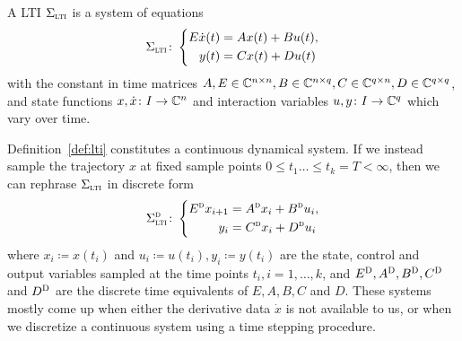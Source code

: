 \begin{definition}\label{def:lti}
    A \acl{LTI} $\Sigma_{\textnormal{\scshape lti}}$ is a system of equations
    \begin{equation}\label{eq:lti}
        \Sigma_{\textnormal{\scshape lti}} \colon \left\lbrace
        \begin{aligned}
            E \dot{x}(t) &= A x(t) + B u(t), \\
            y(t) &= C x(t) + D u(t)
        \end{aligned}
        \right.
    \end{equation}
    with the constant in time matrices $A, E \in \mathbb{C}^{n \times n}, B \in \mathbb{C}^{n \times q}, C \in \mathbb{C}^{q \times n}, D \in \mathbb{C}^{q \times q}$, and state functions $x, \dot{x} \colon I \to \mathbb{C}^n$ and interaction variables $u, y \colon I \to \mathbb{C}^q$ which vary over time.
\end{definition}

\begin{remark}
    Definition~\ref{def:lti} constitutes a continuous dynamical system.
    If we instead sample the trajectory $x$ at fixed sample points $0 \leq t_1 \dots \leq t_k = T < \infty$, then we can rephrase $\Sigma_{\textnormal{\scshape lti}}$ in discrete form
    \begin{equation*}
        \Sigma_{\textnormal{\scshape lti}}^{\textnormal{\scshape d}} \colon \left\lbrace
        \begin{aligned}
            E^{\textnormal{\scshape d}} x_{i + 1} &= A^{\textnormal{\scshape d}} x_i + B^{\textnormal{\scshape d}} u_i, \\
            y_i &= C^{\textnormal{\scshape d}} x_i + D^{\textnormal{\scshape d}} u_i
        \end{aligned}
        \right.
    \end{equation*}
    where $x_i \coloneqq x(t_i)$ and $u_i \coloneqq u(t_i), y_i \coloneqq y(t_i)$ are the state, control and output variables sampled at the time points $t_i, i = 1, \dots, k$, and $E^{\textnormal{\scshape D}}, A^{\textnormal{\scshape D}}, B^{\textnormal{\scshape D}}, C^{\textnormal{\scshape D}}$ and $D^{\textnormal{\scshape D}}$ are the discrete time equivalents of $E, A, B, C$ and $D$.
    These systems mostly come up when either the derivative data $\dot{x}$ is not available to us, or when we discretize a continuous system using a time stepping procedure.
\end{remark}


